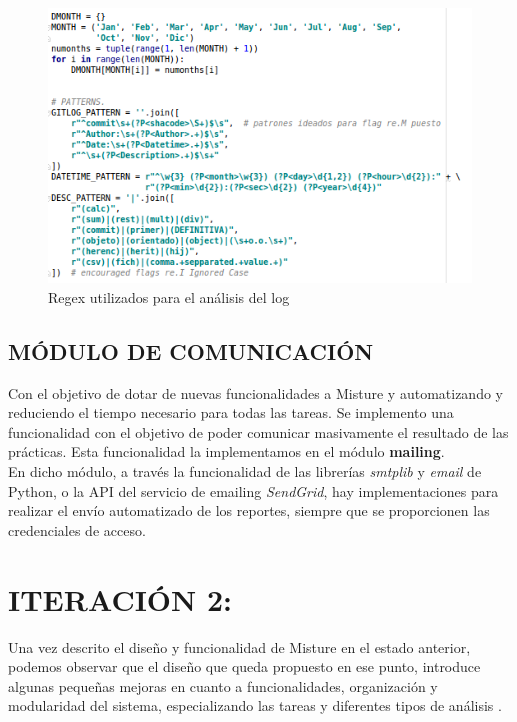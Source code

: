 \begin{figure}[H]
   \centering
   \includegraphics[width=16cm]{img/Selection_025_gitlog_patterns}
   \caption{Regex utilizados para el análisis del log}
   \label{figura:reg_analisis_log}
\end{figure}

\subsection{MÓDULO DE COMUNICACIÓN}

Con el objetivo de dotar de nuevas funcionalidades a Misture y automatizando y reduciendo el tiempo necesario para todas las tareas. Se implemento una funcionalidad con el objetivo de poder comunicar masivamente el resultado de las prácticas. Esta funcionalidad la implementamos en el módulo \textbf{mailing}.\\

En dicho módulo, a través la funcionalidad de las librerías \textit{smtplib} y \textit{email} de Python, o la API del servicio de emailing \textit{SendGrid}, hay implementaciones para realizar el envío automatizado de los reportes, siempre que se proporcionen las credenciales de acceso.


\section{ITERACIÓN 2:} 
\label{subsec:iteracion2}

Una vez descrito el diseño y funcionalidad de Misture en el estado anterior, podemos observar que el diseño que queda propuesto en ese punto, introduce algunas pequeñas mejoras en cuanto a funcionalidades, organización y modularidad del sistema, especializando las tareas y diferentes tipos de análisis .\\


